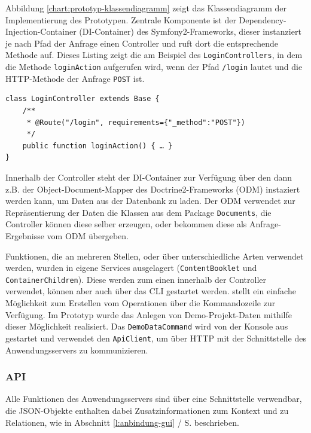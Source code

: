 \bigskip

Abbildung \ref{chart:prototyp-klassendiagramm} zeigt das Klassendiagramm der Implementierung des Prototypen. Zentrale Komponente ist der Dependency-Injection-Container (DI-Container) des Symfony2-Frameworks, dieser instanziert je nach Pfad der Anfrage einen Controller und ruft dort die entsprechende Methode auf. Dieses Listing zeigt die am Beispiel des \texttt{LoginControllers}, in dem die Methode \texttt{loginAction} aufgerufen wird, wenn der Pfad \texttt{/login} lautet und die HTTP-Methode der Anfrage \texttt{POST} ist.

\begin{samepage}
\begin{verbatim}
class LoginController extends Base {
    /**
     * @Route("/login", requirements={"_method":"POST"})
     */
    public function loginAction() { … }
}
\end{verbatim}
\end{samepage}

Innerhalb der Controller steht der DI-Container zur Verfügung über den dann z.B. der Object-Document-Mapper des Doctrine2-Frameworks (ODM) instaziert werden kann, um Daten aus der Datenbank zu laden. Der ODM verwendet zur Repräsentierung der Daten die Klassen aus dem Package \texttt{Documents}, die Controller können diese selber erzeugen, oder bekommen diese als Anfrage-Ergebnisse vom ODM übergeben.

Funktionen, die an mehreren Stellen, oder über unterschiedliche Arten verwendet werden, wurden in eigene Services ausgelagert (\texttt{ContentBooklet} und \texttt{ContainerChildren}). Diese werden zum einen innerhalb der Controller verwendet, können aber auch über das CLI gestartet werden.  stellt ein einfache Möglichkeit zum Erstellen vom Operationen über die Kommandozeile zur Verfügung. Im Prototyp wurde das Anlegen von Demo-Projekt-Daten mithilfe dieser Möglichkeit realisiert. Das \texttt{DemoDataCommand} wird von der Konsole aus gestartet und verwendet den \texttt{ApiClient}, um über HTTP mit der Schnittstelle des Anwendungsservers zu kommunizieren.

\subsubsection{API}

Alle Funktionen des Anwendungsservers sind über eine Schnittstelle verwendbar, die JSON-Objekte enthalten dabei Zusatzinformationen zum Kontext und zu Relationen, wie in Abschnitt \ref{l:anbindung-gui} / S.\pageref{l:anbindung-gui} beschrieben. 


